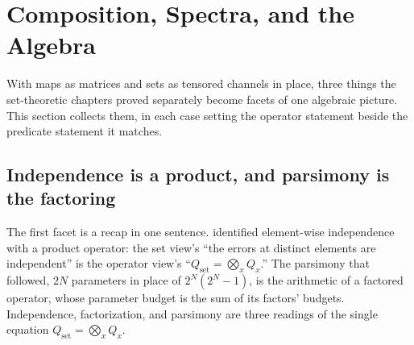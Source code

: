 %

\section{Composition, Spectra, and the Algebra}
\label{sec:operator-composition-spectra}

With maps as matrices and sets as tensored channels in place, three things the
set-theoretic chapters proved separately become facets of one algebraic
picture. This section collects them, in each case setting the operator statement
beside the predicate statement it matches.

\subsection*{Independence is a product, and parsimony is the factoring}

The first facet is a recap in one sentence.
 identified element-wise independence with a
product operator: the set view's ``the errors at distinct elements are
independent'' is the operator view's ``$Q_{\mathrm{set}} = \bigotimes_x Q_x$.''
The parsimony that followed, $2N$ parameters in place of $2^N (2^N - 1)$, is the
arithmetic of a factored operator, whose parameter budget is the sum of its
factors' budgets. Independence, factorization, and parsimony are three readings
of the single equation $Q_{\mathrm{set}} = \bigotimes_x Q_x$.

